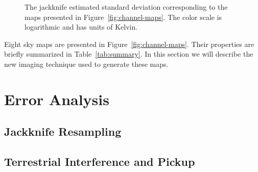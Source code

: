 \documentclass[twocolumn]{aastex61}
\newcommand{\todo}[1]{\textcolor{red}{TODO: #1}\PackageWarning{TODO:}{#1!}}
\begin{document}
\begin{figure*}[p]
    \caption{
        The jackknife estimated standard deviation corresponding to the maps presented in
        Figure~\ref{fig:channel-maps}. The color scale is logarithmic and has units of Kelvin.
    }
    \label{fig:jackknife-maps}
\end{figure*}

Eight sky maps are presented in Figure~\ref{fig:channel-maps}. Their properties are briefly
summarized in Table~\ref{tab:summary}. In this section we will describe the new imaging technique
used to generate these maps.


\section{Error Analysis}

\subsection{Jackknife Resampling}


\subsection{Terrestrial Interference and Pickup}
\end{document}
